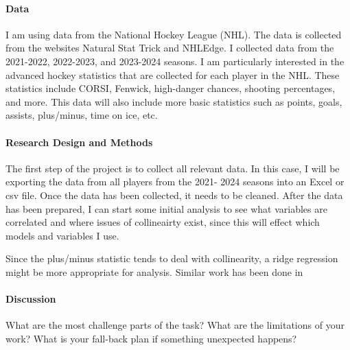 \documentclass[12pt]{article}
\begin{document}
\paragraph{Data}

I am using data from the National Hockey League (NHL). The data is collected from the websites Natural Stat Trick and NHLEdge. 
I collected data from the 2021-2022, 2022-2023, and 2023-2024 seasons. I am particularly interested in the advanced hockey 
statistics that are collected for each player in the NHL. These statistics include CORSI, Fenwick, high-danger chances,
shooting percentages, and more. This data will also include more basic statistics such as points, goals, assists, plus/minus,
time on ice, etc.


\paragraph{Research Design and Methods}
The first step of the project is to collect all relevant data. In this case, I will be exporting the data from all players
from the 2021- 2024 seasons into an Excel or csv file. Once the data has been collected, it needs to be cleaned. After the
data has been prepared, I can start some initial analysis to see what variables are correlated and where issues of collineairty 
exist, since this will effect which models and variables I use. 

Since the plus/minus statistic tends to deal with collinearity, a ridge regression might be more
appropriate for analysis. Similar work has been done in \cite{Macdonald_2012}


\paragraph{Discussion}
What are the most challenge parts of the task?
What are the limitations of your work? What is your fall-back plan if
something unexpected happens?




\end{document}
